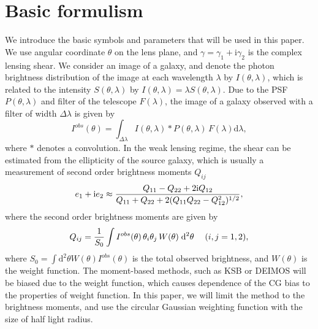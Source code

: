 \documentclass[useAMS,usenatbib]{mn2e}
\renewcommand{\d}{\mathrm{d}}
\newcommand{\ii}{\mathrm{i}}
\newcommand{\be}{\begin{equation}}
\newcommand{\ee}{\end{equation}}
\def\elabel#1{\label{eq:#1}}
\begin{document}
\section{Basic formulism}
We introduce the basic symbols and parameters that will be used in
this paper. We use angular coordinate $\theta$ on the lens plane, and
$\gamma=\gamma_1 + \ii \gamma_2$ is the complex lensing shear. We
consider an image of a galaxy, and denote the photon brightness
distribution of the image at each wavelength $\lambda$ by
$I(\theta,\lambda)$, which is related to the intensity
$S(\theta,\lambda)$ by $I(\theta,\lambda)=\lambda S(\theta,\lambda)$.
Due to the PSF $P(\theta,\lambda)$ and filter of the telescope
$F(\lambda)$, the image of a galaxy observed with a filter of width
$\Delta \lambda$ is given by
%
\be
I^{obs}(\theta) = \int_{\Delta\lambda} I(\theta, \lambda) *  P(\theta,\lambda)
\, F(\lambda)\d \lambda,
\elabel{iobs}
\ee
%
where $*$ denotes a convolution. In the weak lensing regime, the
shear can be estimated from the ellipticity of the source galaxy,
which is usually a measurement of second order brightness moments
$Q_{ij}$ \citep{2001PhR...340..291B}
%
\be
e_1+\ii e_2 \approx
{Q_{11} - Q_{22} + 2 \ii Q_{12} \over Q_{11} + Q_{22} +2(Q_{11}Q_{22} - Q_{12}^2)^{1/2} },
\elabel{mshear}
\ee
%
where the second order brightness moments are given by
%
\be
Q_{ij} = {1 \over S_0} \int  I^{obs}(\theta)\, \theta_i \theta_j \, W(\theta)\; \d^2 \theta \quad\; (i,j=1,2),
\ee
%
where $S_0=\int \d^2\theta W(\theta) I^{obs}(\theta)$ is the total observed
brightness, and $W(\theta)$ is the weight function. The moment-based
methods, such as KSB \citep{1995ApJ...449..460K} or DEIMOS
\citep{2011MNRAS.412.1552M} will be biased due to the weight function,
which causes dependence of the CG bias to the properties of weight
function. In this paper, we will limit the method to the brightness
moments, and use the circular Gaussian weighting function with the
size of half light radius.
\end{document}
